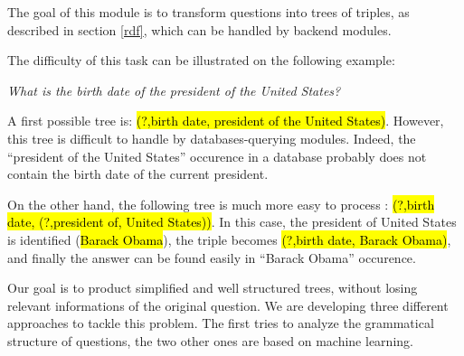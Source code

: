 
The goal of this module is to transform questions into trees of triples, as described in section \ref{rdf}, which can be handled by backend modules.

The difficulty of this task can be illustrated on the following example: 
\begin{center}
 \textit{What is the birth date of the president of the United States?}
\end{center}

A first possible tree is: \hl{(?,birth date, president of the United States)}. However, this tree is difficult to handle by databases-querying modules. Indeed, the ``president of the United States'' occurence in a database probably does not contain the birth date of the current president. 

On the other hand, the following tree is much more easy to process : \hl{(?,birth date, (?,president of, United States))}. In this case, the president of United States is identified (\hl{Barack Obama}), the triple becomes \hl{(?,birth date, Barack Obama)}, and finally the answer can be found easily in ``Barack Obama'' occurence.

Our goal is to product simplified and well structured trees, without losing relevant informations of the original question. We are developing three different approaches to tackle this problem. The first tries to analyze the grammatical structure of questions, the two other ones are based on machine learning.